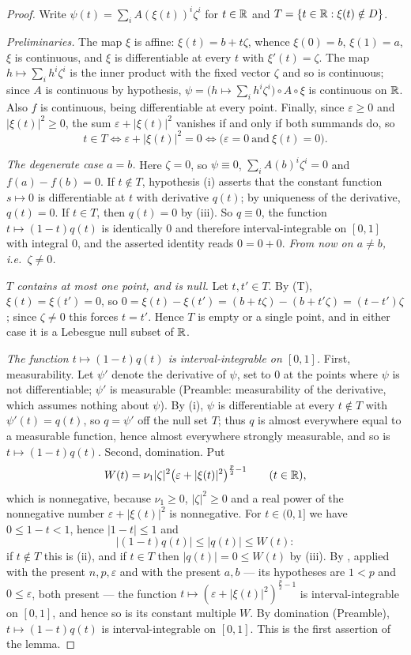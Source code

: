 \begin{proof}
Write $\psi(t)=\sum_iA(\xi(t))^i\zeta^i$ for $t\in\mathbb{R}$ and
$T=\{t\in\mathbb{R}:\xi(t)\notin D\}$.

\emph{Preliminaries.}  The map $\xi$ is affine: $\xi(t)=b+t\zeta$, whence
$\xi(0)=b$, $\xi(1)=a$, $\xi$ is continuous, and $\xi$ is differentiable at
every $t$ with $\xi'(t)=\zeta$.  The map $h\mapsto\sum_ih^i\zeta^i$ is the
inner product with the fixed vector $\zeta$ and so is continuous; since $A$ is
continuous by hypothesis, $\psi=\bigl(h\mapsto\sum_ih^i\zeta^i\bigr)\circ
A\circ\xi$ is continuous on $\mathbb{R}$.  Also $f$ is continuous, being differentiable
at every point.  Finally, since $\varepsilon\ge0$ and $|\xi(t)|^2\ge0$, the sum
$\varepsilon+|\xi(t)|^2$ vanishes if and only if both summands do, so
\[
t\in T\iff\varepsilon+|\xi(t)|^2=0\iff\bigl(\varepsilon=0\ \text{and}\ \xi(t)=0\bigr).
\tag{T}
\]

\emph{The degenerate case $a=b$.}  Here $\zeta=0$, so $\psi\equiv0$,
$\sum_iA(b)^i\zeta^i=0$ and $f(a)-f(b)=0$.  If $t\notin T$, hypothesis (i)
asserts that the constant function $s\mapsto0$ is differentiable at $t$ with
derivative $q(t)$; by uniqueness of the derivative, $q(t)=0$.  If $t\in T$,
then $q(t)=0$ by (iii).  So $q\equiv0$, the function $t\mapsto(1-t)q(t)$ is
identically $0$ and therefore interval-integrable on $[0,1]$ with integral $0$,
and the asserted identity reads $0=0+0$.  \emph{From now on $a\ne b$, i.e.\
$\zeta\ne0$.}

\emph{$T$ contains at most one point, and is null.}  Let $t,t'\in T$.  By (T),
$\xi(t)=\xi(t')=0$, so
$0=\xi(t)-\xi(t')=(b+t\zeta)-(b+t'\zeta)=(t-t')\zeta$; since $\zeta\ne0$ this
forces $t=t'$.  Hence $T$ is empty or a single point, and in either case it is
a Lebesgue null subset of $\mathbb{R}$.

\emph{The function $t\mapsto(1-t)q(t)$ is interval-integrable on $[0,1]$.}
First, measurability.  Let $\psi'$ denote the derivative of $\psi$, set to $0$
at the points where $\psi$ is not differentiable; $\psi'$ is measurable
(Preamble: measurability of the derivative, which assumes nothing about
$\psi$).  By (i), $\psi$ is differentiable at every $t\notin T$ with
$\psi'(t)=q(t)$, so $q=\psi'$ off the null set $T$; thus $q$ is almost
everywhere equal to a measurable function, hence almost everywhere strongly
measurable, and so is $t\mapsto(1-t)q(t)$.  Second, domination.  Put
\[
W(t)=\nu_1|\zeta|^2\bigl(\varepsilon+|\xi(t)|^2\bigr)^{\frac p2-1}\qquad(t\in\mathbb{R}),
\]
which is nonnegative, because $\nu_1\ge0$, $|\zeta|^2\ge0$ and a real power of
the nonnegative number $\varepsilon+|\xi(t)|^2$ is nonnegative.  For
$t\in(0,1]$ we have $0\le1-t<1$, hence $|1-t|\le1$ and
\[
\bigl|(1-t)q(t)\bigr|\le|q(t)|\le W(t):
\]
if $t\notin T$ this is (ii), and if $t\in T$ then $|q(t)|=0\le W(t)$ by (iii).
By \noderef{SegmentWeightIntegrable}, applied with the present $n,p,\varepsilon$
and with the present $a,b$ --- its hypotheses are $1<p$ and $0\le\varepsilon$,
both present --- the function
$t\mapsto(\varepsilon+|\xi(t)|^2)^{\frac p2-1}$ is interval-integrable on
$[0,1]$, and hence so is its constant multiple $W$.  By domination (Preamble),
$t\mapsto(1-t)q(t)$ is interval-integrable on $[0,1]$.  This is the first
assertion of the lemma.


\end{proof}
